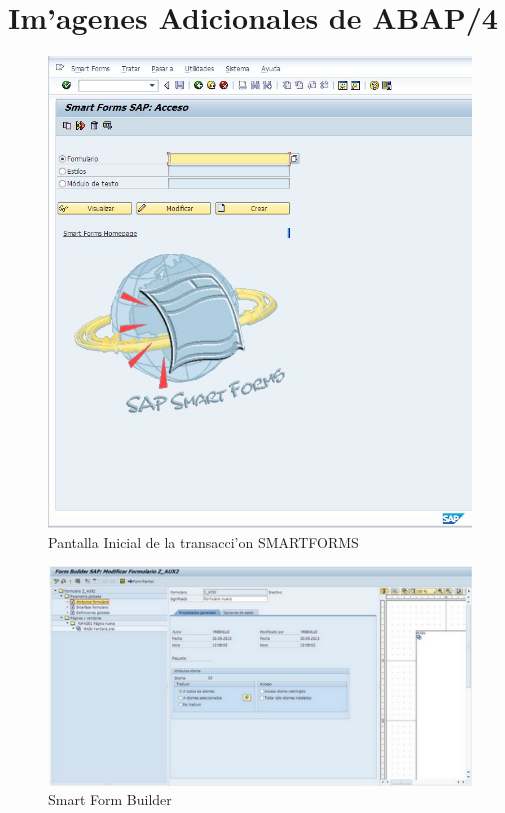 \section{Im'agenes Adicionales de ABAP/4}
\begin{figure}[H]
\centering
\includegraphics[scale=0.65,type=jpg,ext=.jpg,read=.jpg]{figures/sm_initial}
\caption{Pantalla Inicial de la transacci'on SMARTFORMS}
\label{fig:smartforms1}
\end{figure}

\begin{figure}[H]
\centering
\includegraphics[scale=0.65,type=jpg,ext=.jpg,read=.jpg]{figures/builder}
\caption{Smart Form Builder}
\label{fig:builder}
\end{figure}

